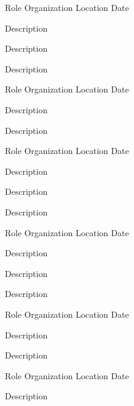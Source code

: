 \begin{cventries}
  \cventry
    {Role} %
    {Organization} %
    {Location} %
    {Date} %
    {
      \begin{cvitems} %
        \item {Description}
        \item {Description}
        \item {Description}
      \end{cvitems}
    }

  \cventry
    {Role} %
    {Organization} %
    {Location} %
    {Date} %
    {
      \begin{cvitems} %
        \item {Description}
        \item {Description}
      \end{cvitems}
    }

  \cventry
    {Role} %
    {Organization} %
    {Location} %
    {Date} %
    {
      \begin{cvitems} %
        \item {Description}
        \item {Description}
        \item {Description}
      \end{cvitems}
    }

  \cventry
    {Role} %
    {Organization} %
    {Location} %
    {Date} %
    {
      \begin{cvitems} %
        \item {Description}
        \item {Description}
        \item {Description}
      \end{cvitems}
    }

  \cventry
    {Role} %
    {Organization} %
    {Location} %
    {Date} %
    {
      \begin{cvitems} %
        \item {Description}
        \item {Description}
      \end{cvitems}
    }

  \cventry
    {Role} %
    {Organization} %
    {Location} %
    {Date} %
    {
      \begin{cvitems} %
        \item {Description}
      \end{cvitems}
    }


\end{cventries}
